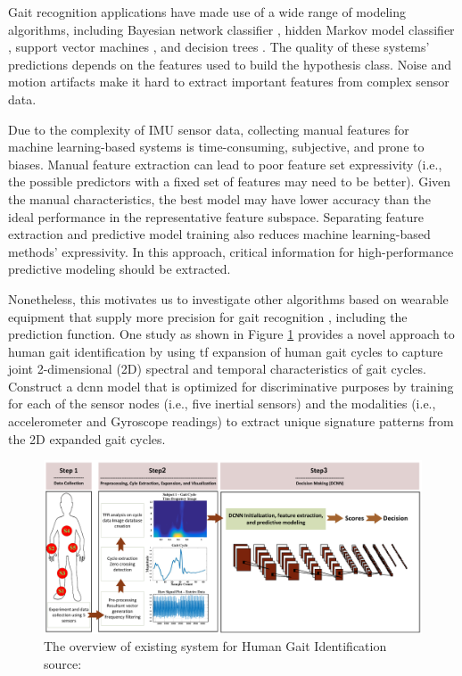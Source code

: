 \bigskip

Gait recognition applications have made use of a wide range of modeling algorithms, including Bayesian network classifier \cite{Kwapisz2010}, hidden Markov model classifier \cite{Rong2007}, support vector machines \cite{Kwapisz2010}, and decision trees \cite{Kwapisz2010}. The quality of these systems' predictions depends on the features used to build the hypothesis class. Noise and motion artifacts make it hard to extract important features from complex sensor data.

\bigskip

Due to the complexity of IMU sensor data, collecting manual features for machine learning-based systems is time-consuming, subjective, and prone to biases. Manual feature extraction can lead to poor feature set expressivity (i.e., the possible predictors with a fixed set of features may need to be better). Given the manual characteristics, the best model may have lower accuracy than the ideal performance in the representative feature subspace. Separating feature extraction and predictive model training also reduces machine learning-based methods' expressivity. In this approach, critical information for high-performance predictive modeling should be extracted.

\pagebreak

\bigskip

Nonetheless, this motivates us to investigate other algorithms based on wearable equipment that supply more precision for gait recognition \cite{Dehzangi2017}, including the prediction function. One study as shown in Figure \ref{fig:The overview of existing system for Human Gait Identification} provides a novel approach to human gait identification by using \ac{tf} expansion of human gait cycles to capture joint 2-dimensional (2D) spectral and temporal characteristics of gait cycles. Construct a \ac{dcnn} model that is optimized for discriminative purposes by training for each of the sensor nodes (i.e., five inertial sensors) and the modalities (i.e., accelerometer and Gyroscope readings) to extract unique signature patterns from the 2D expanded gait cycles.

\begin{figure}[h]
    \centering
    \includegraphics[scale=0.125]{Images/The overview of our existing system for Human Gait Identification.png}
    \captionsetup{justification=centering}
    \caption{The overview of existing system for Human Gait Identification \\ source: \cite{Dehzangi2017}}
    \label{fig:The overview of existing system for Human Gait Identification}
\end{figure}

